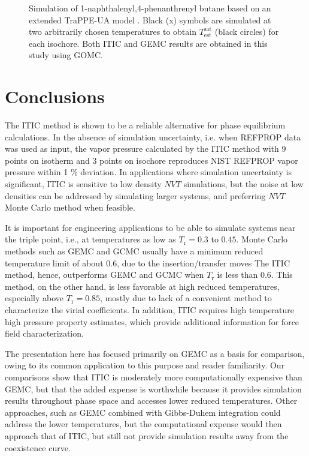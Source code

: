 \documentclass[5p,times]{elsarticle}
\begin{document}
\begin{figure}[]
\centering
{}\label{cc}
\label{aa}
\label{bb}
\caption{
Simulation of 1-naphthalenyl,4-phenanthrenyl butane based on an extended TraPPE-UA model \cite{Yiannourakou2018}. Black (x) symbols are simulated at two arbitrarily chosen temperatures to obtain $T_\mathrm{est}^\mathrm{sat}$ (black circles) for each isochore. Both ITIC and GEMC results are obtained in this study using GOMC.
}
\label{fig:Ex_Sim_TraPPE-1p4nB}
\end{figure}

\section{Conclusions} \label{sec:conclusion} 
The ITIC method is shown to be a reliable alternative for phase equilibrium calculations. In the absence of simulation uncertainty, i.e. when REFPROP data was used as input, the vapor pressure calculated by the ITIC method with 9 points on isotherm and 3 points on isochore reproduces NIST REFPROP vapor pressure within 1 \% deviation. In applications where simulation uncertainty is significant, ITIC is sensitive to low density $NVT$ simulations, but the noise at low densities can be addressed by simulating larger systems, and preferring $NVT$ Monte Carlo method when feasible.

It is important for engineering applications to be able to simulate systems near the triple point, i.e., at temperatures as low as $T_\mathrm{r} = 0.3$ to $0.45$.  Monte Carlo methods such as GEMC and GCMC usually have a minimum reduced temperature limit of about 0.6, due to the insertion/transfer moves The ITIC method, hence, outperforms GEMC and GCMC when $T_\mathrm{r}$ is less than 0.6. This method, on the other hand, is less favorable at high reduced temperatures, especially above $T_\mathrm{r}=0.85$, mostly due to lack of a convenient method to characterize the virial coefficients. In addition, ITIC requires high temperature high pressure property estimates, which provide additional information for force field characterization.

The presentation here has focused primarily on GEMC as a basis for comparison, owing to its common application to this purpose and reader familiarity. Our comparisons show that ITIC is moderately more computationally expensive than GEMC, but that the added expense is worthwhile because it provides simulation results throughout phase space and accesses lower reduced temperatures. Other approaches, such as GEMC combined with Gibbs-Duhem integration could address the lower temperatures, but the computational expense would then approach that of ITIC, but still not provide simulation results away from the coexistence curve.
\end{document}
